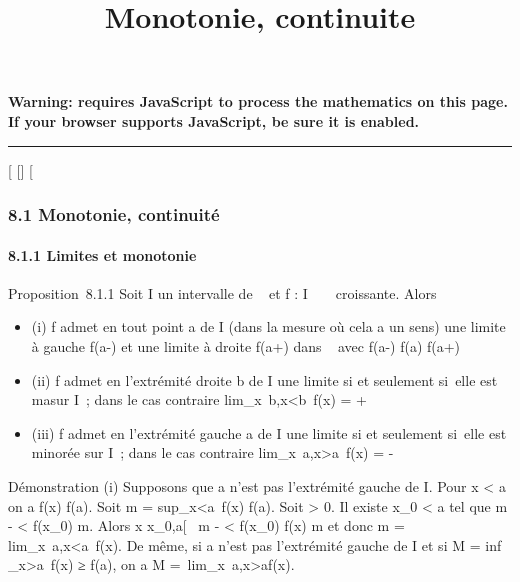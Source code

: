 \documentclass[]{article}
\title{Monotonie, continuite}
\author{}
\date{}
\begin{document}
\maketitle

\textbf{Warning: 
requires JavaScript to process the mathematics on this page.\\ If your
browser supports JavaScript, be sure it is enabled.}

\begin{center}\rule{3in}{0.4pt}\end{center}

{[}
{[}{]}
{[}

\subsubsection{8.1 Monotonie, continuité}

\paragraph{8.1.1 Limites et monotonie}

Proposition~8.1.1 Soit I un intervalle de ~ et f : I \rightarrow~ ~ croissante.
Alors

\begin{itemize}
\itemsep1pt\parskip0pt
\item
  (i) f admet en tout point a de I (dans la mesure où cela a un sens)
  une limite à gauche f(a-) et une limite à droite f(a+) dans ~ avec
  f(a-) \leq f(a) \leq f(a+)
\item
  (ii) f admet en l'extrémité droite b de I une limite si et seulement
  si~elle est ma sur I~; dans le cas contraire
  lim\_x\rightarrow~b,x\textless{}b~f(x) = +\infty~
\item
  (iii) f admet en l'extrémité gauche a de I une limite si et seulement
  si~elle est minorée sur I~; dans le cas contraire
  lim\_x\rightarrow~a,x\textgreater{}a~f(x) = -\infty~
\end{itemize}

Démonstration (i) Supposons que a n'est pas l'extrémité gauche de I.
Pour x \textless{} a on a f(x) \leq f(a). Soit m
= sup\_x\textless{}a~f(x) \leq f(a). Soit
\epsilon \textgreater{} 0. Il existe x\_0 \textless{} a tel que m - \epsilon
\textless{} f(x\_0) \leq m. Alors x \in{]}x\_0,a{[}\rigtharrow~ m - \epsilon
\textless{} f(x\_0) \leq f(x) \leq m et donc m
= lim\_x\rightarrow~a,x\textless{}a~f(x). De même,
si a n'est pas l'extrémité gauche de I et si M
= inf \_x\textgreater{}a~f(x) ≥ f(a),
on a M =\
lim\_x\rightarrow~a,x\textgreater{}af(x).
\end{document}

